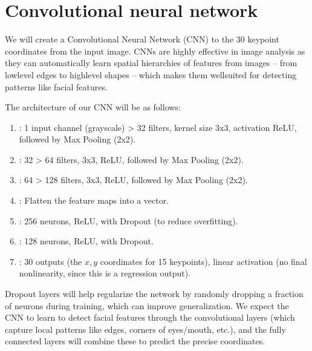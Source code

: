\documentclass[letterpaper,10pt,english]{jupyterBook}
\begin{document}
\section{Convolutional neural network}
\label{\detokenize{04:convolutional-neural-network}}
\sphinxAtStartPar
We will create a Convolutional Neural Network (CNN) to  the 30 keypoint coordinates from the input image. CNNs are highly effective in image analysis as they can automatically learn spatial hierarchies of features from images – from low\sphinxhyphen{}level edges to high\sphinxhyphen{}level shapes – which makes them well\sphinxhyphen{}suited for detecting patterns like facial features.

\sphinxAtStartPar
The architecture of our CNN will be as follows:
\begin{enumerate}
%
\item {} 
\sphinxAtStartPar
{}: 1 input channel (grayscale) \sphinxhyphen{}> 32 filters, kernel size 3x3, activation ReLU, followed by Max Pooling (2x2).

\item {} 
\sphinxAtStartPar
{}: 32 \sphinxhyphen{}> 64 filters, 3x3, ReLU, followed by Max Pooling (2x2).

\item {} 
\sphinxAtStartPar
{}: 64 \sphinxhyphen{}> 128 filters, 3x3, ReLU, followed by Max Pooling (2x2).

\item {} 
\sphinxAtStartPar
{}: Flatten the feature maps into a vector.

\item {} 
\sphinxAtStartPar
{}: 256 neurons, ReLU, with Dropout (to reduce overfitting).

\item {} 
\sphinxAtStartPar
{}: 128 neurons, ReLU, with Dropout.

\item {} 
\sphinxAtStartPar
{}: 30 outputs (the \( x,y \) coordinates for 15 keypoints), linear activation (no final nonlinearity, since this is a regression output).

\end{enumerate}

\sphinxAtStartPar
Dropout layers will help regularize the network by randomly dropping a fraction of neurons during training, which can improve generalization. We expect the CNN to learn to detect facial features through the convolutional layers (which capture local patterns like edges, corners of eyes/mouth, etc.), and the fully connected layers will combine these to predict the precise coordinates.
\end{document}
